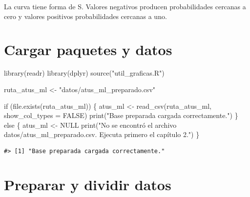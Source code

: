 \documentclass[
  spanish,
  10.5pt,
  letterpaper,
  openany,
  headings=big]{scrbook}
\newenvironment{Shaded}{}{}
\newcommand{\AttributeTok}[1]{\textcolor[rgb]{0.84,0.23,0.29}{#1}}
\newcommand{\ConstantTok}[1]{\textcolor[rgb]{0.00,0.36,0.77}{#1}}
\newcommand{\ControlFlowTok}[1]{\textcolor[rgb]{0.84,0.23,0.29}{#1}}
\newcommand{\FunctionTok}[1]{\textcolor[rgb]{0.44,0.26,0.76}{#1}}
\newcommand{\NormalTok}[1]{\textcolor[rgb]{0.14,0.16,0.18}{#1}}
\newcommand{\OtherTok}[1]{\textcolor[rgb]{0.44,0.26,0.76}{#1}}
\newcommand{\StringTok}[1]{\textcolor[rgb]{0.01,0.18,0.38}{#1}}
\begin{document}
\begin{tcolorbox}[enhanced jigsaw, arc=.35mm, bottomrule=.15mm, bottomtitle=1mm, breakable, colback=white, colbacktitle=quarto-callout-tip-color!10!white, colframe=quarto-callout-tip-color-frame, coltitle=black, left=2mm, leftrule=.75mm, opacityback=0, opacitybacktitle=0.6, rightrule=.15mm, title=\textcolor{quarto-callout-tip-color}{\faLightbulb}\hspace{0.5em}{Interpretación del resultado}, titlerule=0mm, toprule=.15mm, toptitle=1mm]

La curva tiene forma de S. Valores negativos producen probabilidades
cercanas a cero y valores positivos probabilidades cercanas a uno.

\end{tcolorbox}

\section{Cargar paquetes y datos}\label{cargar-paquetes-y-datos}

\begin{Shaded}
\begin{Highlighting}[]
\FunctionTok{library}\NormalTok{(readr)}
\FunctionTok{library}\NormalTok{(dplyr)}
\FunctionTok{source}\NormalTok{(}\StringTok{"util\_graficas.R"}\NormalTok{)}

\NormalTok{ruta\_atus\_ml }\OtherTok{\textless{}{-}} \StringTok{"datos/atus\_ml\_preparado.csv"}

\ControlFlowTok{if}\NormalTok{ (}\FunctionTok{file.exists}\NormalTok{(ruta\_atus\_ml)) \{}
\NormalTok{  atus\_ml }\OtherTok{\textless{}{-}} \FunctionTok{read\_csv}\NormalTok{(ruta\_atus\_ml, }\AttributeTok{show\_col\_types =} \ConstantTok{FALSE}\NormalTok{)}
  \FunctionTok{print}\NormalTok{(}\StringTok{"Base preparada cargada correctamente."}\NormalTok{)}
\NormalTok{\} }\ControlFlowTok{else}\NormalTok{ \{}
\NormalTok{  atus\_ml }\OtherTok{\textless{}{-}} \ConstantTok{NULL}
  \FunctionTok{print}\NormalTok{(}\StringTok{"No se encontró el archivo datos/atus\_ml\_preparado.csv. Ejecuta primero el capítulo 2."}\NormalTok{)}
\NormalTok{\}}
\end{Highlighting}
\end{Shaded}

\begin{verbatim}
#> [1] "Base preparada cargada correctamente."
\end{verbatim}

\section{Preparar y dividir datos}\label{preparar-y-dividir-datos}
\end{document}
